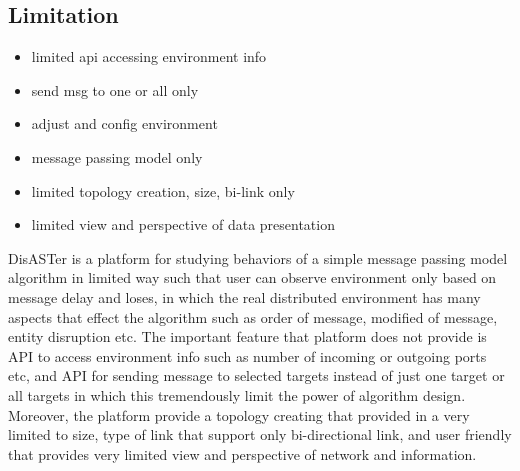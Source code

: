 \subsection*{Limitation}
\begin{itemize}
\item limited api accessing environment info
\item send msg to one or all only
\item adjust and config environment
\item message passing model only
\item limited topology creation, size, bi-link only
\item limited view and perspective of data presentation
\end{itemize}

DisASTer is a platform for studying behaviors of a simple message passing model algorithm in limited way such that user can observe environment only based on message delay and loses, in which the real distributed environment has many aspects that effect the algorithm such as order of message, modified of message, entity disruption etc. The important feature that platform does not provide is API to access environment info such as number of incoming or outgoing ports etc, and API for sending message to selected targets instead of just one target or all targets in which this tremendously limit the power of algorithm design. Moreover, the platform provide a topology creating that provided in a very limited to size, type of link that support only bi-directional link, and user friendly that provides very limited view and perspective of network and information.

